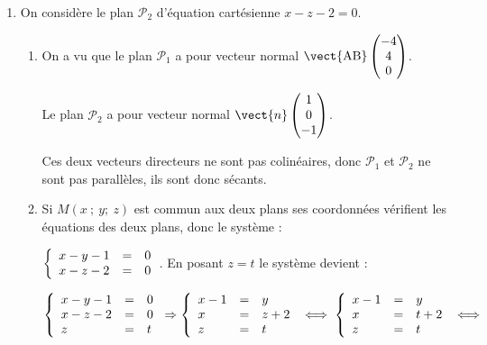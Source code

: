 \begin{enumerate}
\begin{enumerate}
On en déduit : EA$^2 = 25 + 81 + 81 = 187$ et EA$^2 = 81 + 25 + 81 = 187$.

EA$^2 = \text{EB}^2 \Rightarrow \text{EA} = \text{EB}$.

	\end{enumerate}	
\item On considère le plan $\mathcal{P}_2$ d'équation cartésienne $x - z - 2 = 0$.
	\begin{enumerate}
		\item %
On a vu que le plan $\mathcal{P}_1$ a pour vecteur normal $\vect{\text{AB}}\begin{pmatrix}-4\\4\\0\end{pmatrix}$.

Le plan $\mathcal{P}_2$ a pour vecteur normal $\vect{n}\begin{pmatrix}1\\0\\-1\end{pmatrix}$.

Ces deux vecteurs directeurs ne sont pas colinéaires, donc $\mathcal{P}_1$ et $\mathcal{P}_2$ ne sont pas parallèles, ils sont donc sécants.
		\item %
		

Si $M(x~;~y;~z)$ est commun aux deux plans ses coordonnées vérifient les équations des deux plans, donc le système :

$\left\{\begin{array}{l c l}
x - y - 1 &=& 0\\
x - z - 2 &=& 0
\end{array}\right.$. En posant $z = t$ le système devient :

$\left\{\begin{array}{l c l}
x - y - 1 &=& 0\\
x - z - 2 &=& 0\\
z&=&t
\end{array}\right.\Rightarrow \left\{\begin{array}{l c l}
x - 1 &=&y\\
x &=&z + 2\\
z&=&t
\end{array}\right. \iff \left\{\begin{array}{l c l}
x - 1 &=&y\\
x &=&t + 2\\
z&=&t
\end{array}\right. \iff$


\end{enumerate}
\end{enumerate}
